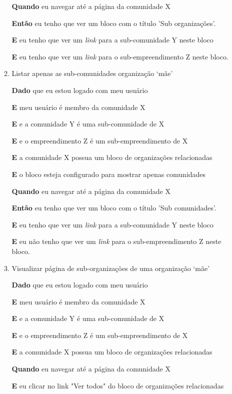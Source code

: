 \begin{enumerate}
\begin{enumerate}
\textbf{Quando} eu navegar até a página da comunidade X

\textbf{Então} eu tenho que ver um bloco com o título 'Sub organizações'.

\textbf{E} eu tenho que ver um \textit{link} para a sub-comunidade Y neste
bloco

\textbf{E} eu tenho que ver um \textit{link} para o sub-empreendimento Z neste
bloco.

\item Listar apenas as sub-comunidades organização `mãe'

\textbf{Dado} que eu estou logado com meu usuário

\textbf{E} meu usuário é membro da comunidade X

\textbf{E} e a comunidade Y é uma sub-comunidade de X

\textbf{E} e o empreendimento Z é um sub-empreendimento de X

\textbf{E} a comunidade X possua um bloco de organizações relacionadas

\textbf{E} o bloco esteja configurado para mostrar apenas comunidades

\textbf{Quando} eu navegar até a página da comunidade X

\textbf{Então} eu tenho que ver um bloco com o título 'Sub comunidades'.

\textbf{E} eu tenho que ver um \textit{link} para a sub-comunidade Y neste
bloco

\textbf{E} eu não tenho que ver um \textit{link} para o sub-empreendimento Z
neste bloco.

\item Visualizar página de sub-organizações de uma organização `mãe'

\textbf{Dado} que eu estou logado com meu usuário

\textbf{E} meu usuário é membro da comunidade X

\textbf{E} e a comunidade Y é uma sub-comunidade de X

\textbf{E} e o empreendimento Z é um sub-empreendimento de X

\textbf{E} a comunidade X possua um bloco de organizações relacionadas

\textbf{Quando} eu navegar até a página da comunidade X

\textbf{E} eu clicar no link "Ver todos" do bloco de organizações relacionadas


\end{enumerate}
\end{enumerate}
